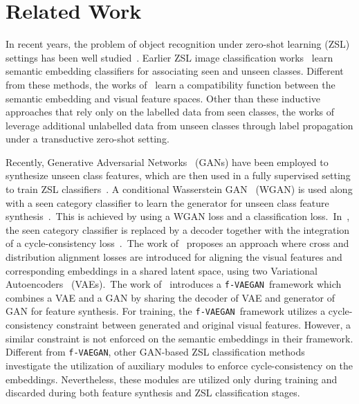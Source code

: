 \documentclass[runningheads]{llncs}
\newcommand{\vaegan}{\texttt{f-VAEGAN}}
\begin{document}
\section{Related Work}

In recent years, the problem of object recognition under zero-shot learning (ZSL) settings has been well studied~\cite{Jayaraman14nips,fu15pami,akata15label,frome13nips,romera15icml,rohrbach13nips,Ye17cvpr,Xian18cvpr}. Earlier ZSL image classification works~\cite{Jayaraman14nips,lampert13pami} learn semantic embedding classifiers for associating seen and unseen classes. Different from these methods, the works of~\cite{akata15label,frome13nips,romera15icml} learn a compatibility function between the semantic embedding and visual feature spaces. Other than these inductive approaches that rely only on the labelled data from seen classes, the works of~\cite{fu15pami,rohrbach13nips,Ye17cvpr} leverage additional unlabelled data from unseen classes through label propagation under a transductive zero-shot setting. 



Recently, Generative Adversarial Networks~\cite{GAN} (GANs) have been employed to synthesize unseen class features, which are then used in a fully supervised setting to train ZSL classifiers~\cite{Xian18cvpr,Rafael18eccv,li19leveraging,Xian19cvpr}. A conditional Wasserstein GAN~\cite{wgan} (WGAN) is used along with a seen category classifier to learn the generator for unseen class feature synthesis~\cite{Xian18cvpr}.~This is achieved by using a WGAN loss and a classification loss.~In~\cite{Rafael18eccv}, the seen category classifier is replaced by a decoder together with the integration of a cycle-consistency loss~\cite{CycleGAN}.~The work of~\cite{schonfeld19cvpr} proposes an approach where cross and distribution alignment losses are introduced for aligning the visual features and corresponding embeddings in a shared latent space, using two Variational Autoencoders~\cite{kingma13iclr} (VAEs).~The work of~\cite{Xian19cvpr} introduces a \vaegan~framework which combines a VAE and a GAN by sharing the decoder of VAE and generator of GAN for feature  synthesis.  For training, the \vaegan~framework utilizes a cycle-consistency constraint between generated and original visual features. However, a similar constraint is not enforced on the semantic embeddings in their framework. Different from \vaegan, other GAN-based ZSL classification methods~\cite{Rafael18eccv,Zhang18ijcai,huang19generative,Mandal19cvpr} investigate the utilization of auxiliary modules to enforce cycle-consistency on the embeddings. Nevertheless, these modules are utilized only during training and discarded during both feature synthesis and ZSL classification stages.
\end{document}
